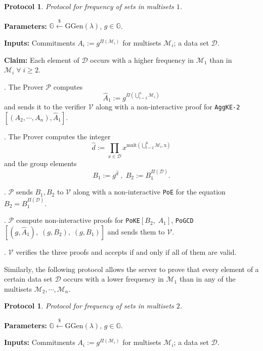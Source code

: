 \documentclass[11pt, lettersize, notitlepage, leqno, footskip=0.6cm]{article}
\newcommand{\pl}{\prod\limits}
\newcommand{\mc}{\mathcal}
\newcommand{\mb}{\mathbb}
\newcommand{\mr}{\mathrm}
\newcommand{\lamb}{\lambda}
\newcommand{\what}{\widehat}
\newcommand{\mP}{\mc{P}}
\newcommand{\V}{\mc{V}}
\newcommand{\vs}{\vspace{-0.15cm}}
\newcommand{\noin}{\noindent}
\newtheorem{Prot}[Thm]{Protocol}
\numberwithin{equation}{section}
\begin{document}
\begin{Prot} Protocol for frequency of sets in multisets $1$.\end{Prot} \vspace{-0.3cm}

\noin \textbf{Parameters:} $\mb{G}\xleftarrow{\$} \mr{GGen}(\lamb)$,\; $g\in \mb{G}$.

\noin \textbf{Inputs:} Commitments $A_i := g^{\Pi(\mc{M}_i)}$ for multisets $\mc{M}_i$; a data set $\mc{D}$.

\noin \textbf{Claim:} Each element of $\mc{D}$ occurs with a higher frequency in $\mc{M}_1$ than in $\mc{M}_i\;\forall\;i\geq 2$.

\begin{prf1}\noin {}. The Prover $\mP$ computes \vs $$\what{A}_1:= g^{\Pi\left(\bigcup\limits_{i=2}^n \mc{M}_i\right)} $$ and sends it to the verifier $\V$ along with a non-interactive proof for \verb|AggKE-2|$[(A_2,\cdots,A_n), \what{A}_1]$.

\noin 2. The Prover computes the integer \vs $$\what{d}:= \pl_{x\in \mc{D}} x^{\mr{mult\left(\bigcup\limits_{i=2}^n \mc{M}_i, x\right)}} $$ and the group elements \vs $$B_1:= g^{\what{d}}\;,\;B_2:= B_1^{\Pi(\mc{D})} .$$

\noin 3. $\mP$ sends $B_1, B_2$ to $\V$ along with a non-interactive \verb|PoE| for the equation $B_2= B_1^{\Pi(\mc{D})}$.

\noin 4. $\mP$ compute non-interactive proofs for \verb|PoKE|$[B_2,\;A_1]$, \verb|PoGCD|$[(g, \what{A}_1),\;(g, B_2),\;(g, B_1)]$ and sends them to $\V$.

\noin 5. $\V$ verifies the three proofs and accepts if and only if all of them are valid.\end{prf1}

Similarly, the following protocol allows the server to prove that every element of a certain data set $\mc{D}$ occurs with a lower frequency in $\mc{M}_1$ than in any of the multisets $\mc{M}_2,\cdots,\mc{M}_n$.

\begin{Prot} Protocol for frequency of sets in multisets $2$.\end{Prot} \vspace{-0.3cm}

\noin \textbf{Parameters:} $\mb{G}\xleftarrow{\$} \mr{GGen}(\lamb)$,\; $g\in \mb{G}$.

\noin \textbf{Inputs:} Commitments $A_i := g^{\Pi(\mc{M}_i)}$ for multisets $\mc{M}_i$; a data set $\mc{D}$.
\end{document}
